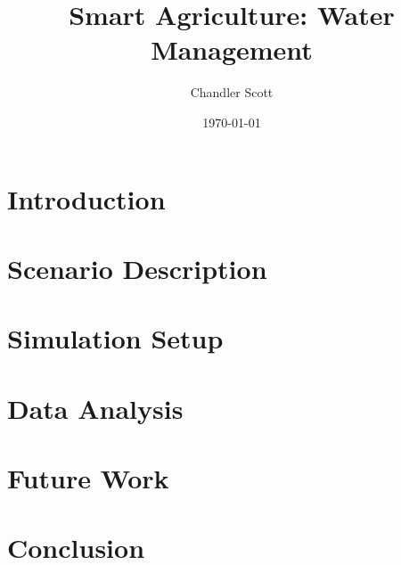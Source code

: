 \documentclass[12pt]{article}
\title{Smart Agriculture: Water Management}
\author{Chandler Scott}
\date{\today}
\begin{document}
\maketitle
\clearpage
\section{Introduction}\label{sec:intro}

\section{Scenario Description}\label{sec:scenario}

\section{Simulation Setup}\label{sec:sim}

\section{Data Analysis}\label{sec:data}

\section{Future Work}\label{sec:future}

\section{Conclusion}\label{sec:conclusion}
\end{document}
